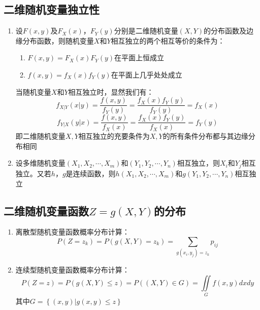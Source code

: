 \documentclass[12pt,a4paper,UTF8]{book}
\begin{document}
\subsection{二维随机变量独立性}
\begin{enumerate}
\item 设$F\left(x,y\right)$及$F_X\left(x\right)$，$F_Y\left(y\right)$分别是二维随机变量$\left(X,Y\right)$的分布函数及边缘分布函数，则随机变量$X$和$Y$相互独立的两个相互等价的条件为：
\begin{enumerate}
\item $F\left(x,y\right)=F_X\left(x\right)F_Y\left(y\right)$在平面上恒成立
\item $f\left(x,y\right)=f_X\left(x\right)f_Y\left(y\right)$在平面上几乎处处成立
\end{enumerate}
当随机变量$X$和$Y$相互独立时，显然我们有：
\[f_{X|Y}\left(x|y\right)=\frac{f\left(x,y\right)}{f_Y\left(y\right)}=\frac{f_X\left(x\right)f_Y\left(y\right)}{f_Y\left(y\right)}=f_X\left(x\right)\]
\[f_{Y|X}\left(y|x\right)=\frac{f\left(x,y\right)}{f_X\left(x\right)}=\frac{f_X\left(x\right)f_Y\left(y\right)}{f_X\left(x\right)}=f_Y\left(y\right)\]
即二维随机变量$X,Y$相互独立的充要条件为$X,Y$的所有条件分布都与其边缘分布相同
\item 设多维随机变量$\left(X_1,X_2,\cdots,X_m\right)$和$\left(Y_1,Y_2,\cdots,Y_n\right)$相互独立，则$X_i$和$Y_j$相互独立。又若$h$，$g$是连续函数，则$h\left(X_1,X_2,\cdots,X_m\right)$和$g\left(Y_1,Y_2,\cdots,Y_n\right)$相互独立
\end{enumerate}

\subsection{二维随机变量函数$Z=g\left(X,Y\right)$的分布}
\begin{enumerate}
\item 离散型随机变量函数概率分布计算：
\[P\left(Z=z_k\right)=P\left(g\left(X,Y\right)=z_k\right)=\sum\limits_{g\left(x_i,y_j\right)=z_k}p_{ij}\]
\item 连续型随机变量函数概率分布计算：
\[P\left(Z=z\right)=P\left(g\left(X,Y\right)\leq z\right)=P\left(\left(X,Y\right)\in G\right)=\iint\limits_{G}f\left(x,y\right)dxdy\]
其中$G=\left\{\left(x,y\right)|g\left(x,y\right)\leq z\right\}$
\end{enumerate}
\end{document}
